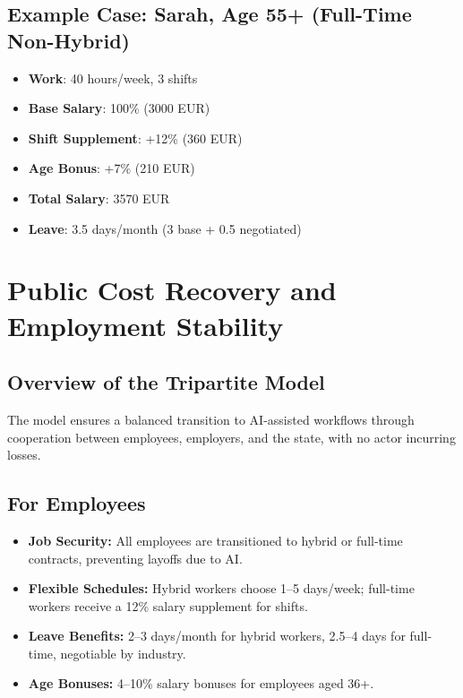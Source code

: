 \documentclass[12pt]{article}
\begin{document}
\subsection{Example Case: Sarah, Age 55+ (Full-Time Non-Hybrid)}
\begin{itemize}
  \item \textbf{Work}: 40 hours/week, 3 shifts
  \item \textbf{Base Salary}: 100\% (3000 EUR)
  \item \textbf{Shift Supplement}: +12\% (360 EUR)
  \item \textbf{Age Bonus}: +7\% (210 EUR)
  \item \textbf{Total Salary}: 3570 EUR
  \item \textbf{Leave}: 3.5 days/month (3 base + 0.5 negotiated)
\end{itemize}

\section{Public Cost Recovery and Employment Stability}

\subsection{Overview of the Tripartite Model}
The model ensures a balanced transition to AI-assisted workflows through cooperation between employees, employers, and the state, with no actor incurring losses.

\subsection{For Employees}
\begin{itemize}
  \item \textbf{Job Security:} All employees are transitioned to hybrid or full-time contracts, preventing layoffs due to AI.
  \item \textbf{Flexible Schedules:} Hybrid workers choose 1--5 days/week; full-time workers receive a 12\% salary supplement for shifts.
  \item \textbf{Leave Benefits:} 2--3 days/month for hybrid workers, 2.5--4 days for full-time, negotiable by industry.
  \item \textbf{Age Bonuses:} 4--10\% salary bonuses for employees aged 36+.
\end{itemize}
\end{document}
